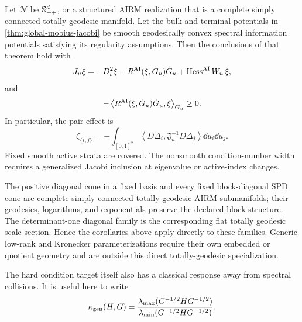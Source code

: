 \begin{corollary}
\label{cor:spd-mobius-jacobi}
Let \(\mathcal N\) be \(\mathbb S_{++}^d\), or a structured AIRM realization that is
a complete simply connected totally geodesic manifold.  Let the bulk and
terminal potentials in \cref{thm:global-mobius-jacobi} be smooth
geodesically convex spectral information potentials satisfying its
regularity assumptions.  Then the conclusions of that theorem hold with
\[
  J_u\xi
  =-D_t^2\xi-R^{\mathrm{AI}}(\xi,\dot G_u)\dot G_u
  +\operatorname{Hess}^{\mathrm{AI}}W_u\,\xi,
\]
and
\[
  -\left\langle R^{\mathrm{AI}}(\xi,\dot G_u)\dot G_u,\xi\right\rangle_{G_u}\ge0.
\]
In particular, the pair effect is
\[
  \boxed{
  \zeta_{\{i,j\}}
  =-\int_{[0,1]^2}
  \left\langle
  D\Delta_i,\mathfrak J_u^{-1}D\Delta_j
  \right\rangle\dd u_i\dd u_j.}
\]
Fixed smooth active strata are covered.  The nonsmooth condition-number width
requires a generalized Jacobi inclusion at eigenvalue or active-index
changes.
\end{corollary}

\begin{remark}
The positive diagonal cone in a fixed basis and every fixed block-diagonal
SPD cone are complete simply connected totally geodesic AIRM submanifolds;
their geodesics, logarithms, and exponentials preserve the declared block
structure.  The determinant-one diagonal family is the corresponding flat
totally geodesic scale section.  Hence the corollaries above apply directly to
these families.  Generic low-rank and Kronecker parameterizations require
their own embedded or quotient geometry and are outside this direct
totally-geodesic specialization.
\end{remark}

The hard condition target itself also has a classical response away from
spectral collisions.  It is useful here to write
\[
  \kappa_{\rm gen}(H,G)
  =\frac{\lambda_{\max}(G^{-1/2}HG^{-1/2})}
  {\lambda_{\min}(G^{-1/2}HG^{-1/2})}.
\]

